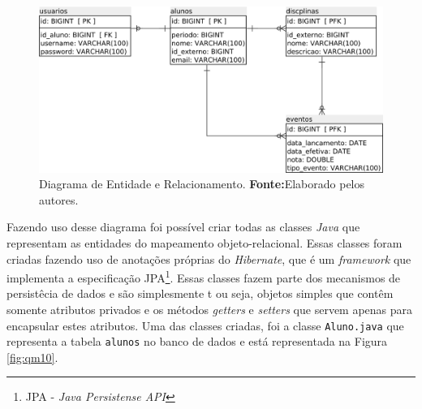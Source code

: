 		\begin{figure}[h!]
			\centerline{\includegraphics[scale=0.4]{./imagens/2_q_metodologico/qm9.png}}
			\caption[Diagrama de Entidade e Relacionamento]{Diagrama de Entidade e
			Relacionamento.
			\textbf{Fonte:}Elaborado pelos autores.}
			\label{fig:qm9}
		\end{figure}
\pagebreak
		\par Fazendo uso desse diagrama foi possível criar todas as classes 
	\textit{Java} que representam as entidades do mapeamento objeto-relacional. 
	Essas classes foram criadas fazendo uso de anotações próprias do
	\textit{Hibernate}, que é um \textit{framework} que implementa a especificação
	JPA\footnote{JPA - \textit{Java Persistense API}}. Essas classes fazem parte
	dos mecanismos de persistêcia de dados e são simplesmente t ou seja, objetos
	simples que contêm somente atributos privados e os métodos \textit{getters} e
	\textit{setters} que servem apenas para encapsular estes atributos. Uma das
	classes criadas, foi a classe \texttt{Aluno.java} que representa a tabela
	\texttt{alunos} no banco de dados e está representada na Figura
	\ref{fig:qm10}.%
	
